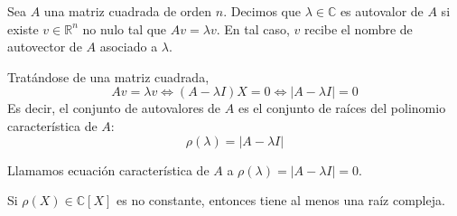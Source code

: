 \begin{definition}
    Sea $A$ una matriz cuadrada de orden $n$.
    Decimos que $\lambda \in \mathbb{C}$ es autovalor de $A$ si existe $v \in \mathbb{R}^n$ no nulo tal que $Av = \lambda v$.
    En tal caso, $v$ recibe el nombre de autovector de $A$ asociado a $\lambda$.

    Tratándose de una matriz cuadrada,
    $$Av = \lambda v \Leftrightarrow (A-\lambda I)X = 0 \Leftrightarrow |A-\lambda I| = 0$$
    Es decir, el conjunto de autovalores de $A$ es el conjunto de raíces del polinomio característica de $A$:
    $$\rho(\lambda) = |A - \lambda I|$$

    Llamamos ecuación característica de $A$ a $\rho(\lambda) = |A - \lambda I| = 0$.
\end{definition}

\begin{theorem}
    Si $\rho(X) \in \mathbb{C}[X]$ es no constante, entonces tiene al menos una raíz compleja.
\end{theorem}